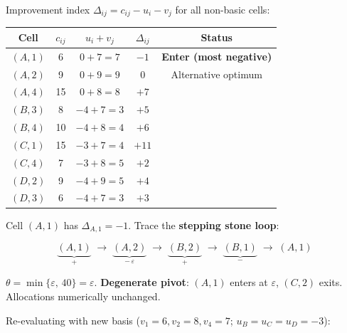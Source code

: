 \documentclass[12pt]{article}
\begin{document}
Improvement index $\Delta_{ij} = c_{ij} - u_i - v_j$ for all non-basic cells:

\begin{center}
\renewcommand{\arraystretch}{1.3}
\begin{tabular}{|c|c|c|c|c|}
  \hline
  \rowcolor{primary}
  {\color{white}\textbf{Cell}} &
  {\color{white}$c_{ij}$} &
  {\color{white}$u_i + v_j$} &
  {\color{white}$\Delta_{ij}$} &
  {\color{white}\textbf{Status}} \\
  \hline
  \rowcolor{red!15} $(A,1)$ & 6 & $0+7=7$ & $-1$ & \textbf{Enter (most negative)} \\
  \hline
  $(A,2)$ & 9 & $0+9=9$ & $0$ & Alternative optimum \\
  \hline
  $(A,4)$ & 15 & $0+8=8$ & $+7$ & \\
  \hline
  $(B,3)$ & 8 & $-4+7=3$ & $+5$ & \\
  \hline
  $(B,4)$ & 10 & $-4+8=4$ & $+6$ & \\
  \hline
  $(C,1)$ & 15 & $-3+7=4$ & $+11$ & \\
  \hline
  $(C,4)$ & 7 & $-3+8=5$ & $+2$ & \\
  \hline
  $(D,2)$ & 9 & $-4+9=5$ & $+4$ & \\
  \hline
  $(D,3)$ & 6 & $-4+7=3$ & $+3$ & \\
  \hline
\end{tabular}
\end{center}

\vspace{4pt}
Cell $(A,1)$ has $\Delta_{A,1} = -1$. Trace the \textbf{stepping stone loop}:

\[
  \underbrace{(A,1)}_{+} \;\longrightarrow\;
  \underbrace{(A,2)}_{\displaystyle-\,\varepsilon} \;\longrightarrow\;
  \underbrace{(B,2)}_{+} \;\longrightarrow\;
  \underbrace{(B,1)}_{-} \;\longrightarrow\; (A,1)
\]

$\theta = \min\{\varepsilon,\,40\} = \varepsilon$. \textbf{Degenerate pivot}: $(A,1)$ enters at $\varepsilon$, $(C,2)$ exits. Allocations numerically unchanged.

\medskip
Re-evaluating with new basis ($v_1=6, v_2=8, v_4=7$; $u_B=u_C=u_D=-3$):
\end{document}
